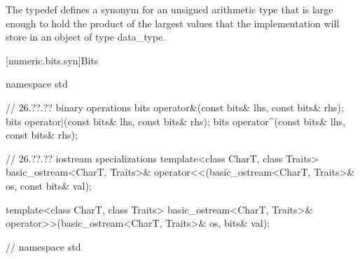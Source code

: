 \begin{itemdescr}
The typedef defines a synonym for an unsigned arithmetic type that is large enough to hold the product of the largest values that the implementation will store in an object of type data_type.		
\end{itemdescr}

%
[numeric.bits.syn]{Bits}

\begin{codeblock}
namespace std {
  
  // 26.??.?? binary operations
  bits operator&(const bits& lhs, const bits& rhs);
  bits operator|(const bits& lhs, const bits& rhs);
  bits operator^(const bits& lhs, const bits& rhs);
  
  // 26.??.?? iostream specializations
  template<class CharT, class Traits>
    basic_ostream<CharT, Traits>& operator<<(basic_ostream<CharT, Traits>& os,
                                             const bits& val);
  
  template<class CharT, class Traits>
    basic_ostream<CharT, Traits>& operator>>(basic_ostream<CharT, Traits>& os,
                                             bits& val);

} // namespace std
\end{codeblock}
       
